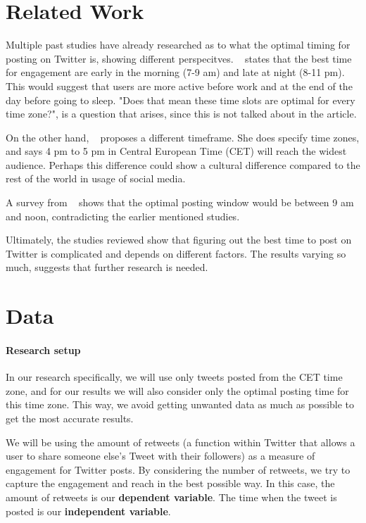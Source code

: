 \documentclass[11pt]{article}
\begin{document}
\section{Related Work}
Multiple past studies have already researched as to what the optimal timing for posting on Twitter is, showing different perspecitves. ~\cite{Anoob:2023} states that the best time for engagement are early in the morning (7-9 am) and late at night (8-11 pm). This would suggest that users are more active before work and at the end of the day before going to sleep. "Does that mean these time slots are optimal for every time zone?", is a question that arises, since this is not talked about in the article.

On the other hand, ~\cite{Myers:2024} proposes a different timeframe. She does specify time zones, and says 4 pm to 5 pm in Central European Time (CET) will reach the widest audience. Perhaps this difference could show a cultural difference compared to the rest of the world in usage of social media.

A survey from ~\cite{Needle:2023} shows that the optimal posting window would be between 9 am and noon, contradicting the earlier mentioned studies.

Ultimately, the studies reviewed show that figuring out the best time to post on Twitter is complicated and depends on different factors. The results varying so much, suggests that further research is needed.

\section{Data}


\paragraph{Research setup}
In our research specifically, we will use only tweets posted from the CET time zone, and for our results we will also consider only the optimal posting time for this time zone. This way, we avoid getting unwanted data as much as possible to get the most accurate results.

We will be using the amount of retweets (a function within Twitter that allows a user to share someone else's Tweet with their followers) as a measure of engagement for Twitter posts.  By considering the number of retweets, we try to capture the engagement and reach in the best possible way. In this case, the amount of retweets is our \textbf{dependent variable}. The time when the tweet is posted is our \textbf{independent variable}.
\end{document}
